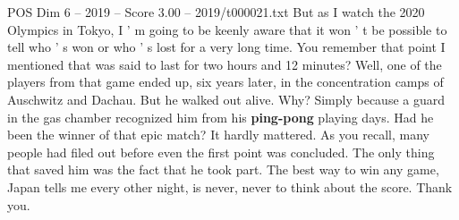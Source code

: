 \begin{textsample}{POS Dim 6 – 2019 – Score 3.00 – 2019/t000021.txt}
But as I watch the 2020 Olympics in Tokyo, I ' m going to be keenly aware that it won ' t be possible to tell who ' s won or who ' s lost for a very long time.
You remember that point I mentioned that was said to last for two hours and 12 minutes?
Well, one of the players from that game ended up, six years later, in the concentration camps of Auschwitz and Dachau.
But he walked out alive.
Why?
Simply because a guard in the gas chamber recognized him from his \textbf{ping-pong} playing days.
Had he been the winner of that epic match?
It hardly mattered.
As you recall, many people had filed out before even the first point was concluded.
The only thing that saved him was the fact that he took part.
The best way to win any game, Japan tells me every other night, is never, never to think about the score.
Thank you.

\end{textsample}

